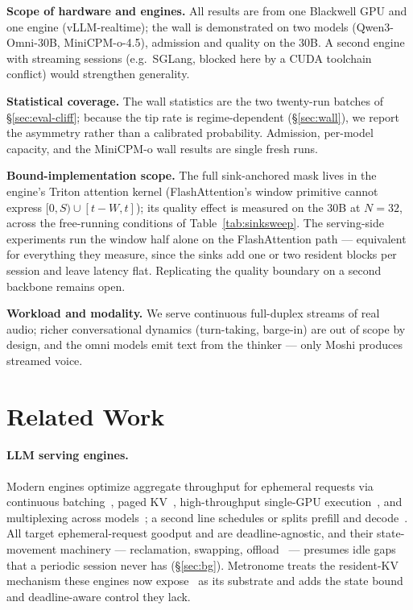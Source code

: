 \textbf{Scope of hardware and engines.} All results are from one Blackwell GPU and one engine
(vLLM-realtime); the wall is demonstrated on two models (Qwen3-Omni-30B, MiniCPM-o-4.5), admission and
quality on the 30B. A second engine with streaming sessions (e.g.\ SGLang, blocked here by a CUDA
toolchain conflict) would strengthen generality.

\textbf{Statistical coverage.} The wall statistics are the two twenty-run batches of
\S\ref{sec:eval-cliff}; because the tip rate is regime-dependent (\S\ref{sec:wall}), we report the
asymmetry rather than a calibrated probability. Admission, per-model capacity, and the MiniCPM-o wall
results are single fresh runs.

\textbf{Bound-implementation scope.} The full sink-anchored mask lives in the engine's Triton
attention kernel (FlashAttention's window primitive cannot express $[0,S) \cup [t{-}W,t]$); its
quality effect is measured on the 30B at $N{=}32$, across the free-running conditions of
Table~\ref{tab:sinksweep}. The serving-side experiments run the window half alone on the
FlashAttention path --- equivalent for everything they measure, since the sinks add one or two
resident blocks per session and leave latency flat. Replicating the quality boundary on a second
backbone remains open.

\textbf{Workload and modality.} We serve continuous full-duplex streams of real audio; richer
conversational dynamics (turn-taking, barge-in) are out of scope by design, and the omni models emit
text from the thinker --- only Moshi produces streamed voice.

\section{Related Work}
\label{sec:related}

\paragraph{LLM serving engines.} Modern engines optimize aggregate throughput for ephemeral requests via
continuous batching~\citep{orca,vllm}, paged KV~\citep{vllm}, high-throughput single-GPU
execution~\citep{sglang,flexgen}, and multiplexing across models~\citep{alpaserve}; a second line
schedules or splits prefill and decode~\citep{sarathi,distserve,splitwise}. All target ephemeral-request
goodput and are deadline-agnostic, and their state-movement machinery --- reclamation, swapping,
offload~\citep{vllm,flexgen} --- presumes idle gaps that a periodic session never has
(\S\ref{sec:bg}). Metronome treats the resident-KV mechanism these engines now
expose~\citep{vllmrealtime} as its substrate and adds the state bound and deadline-aware control they
lack.


